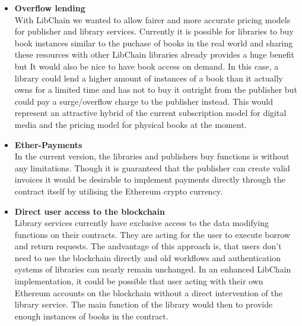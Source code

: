 \begin{itemize}
\item \textbf{Overflow lending}\\
With LibChain we wanted to allow fairer and more accurate pricing models for publisher and library services. Currently it is possible for libraries to buy book instances similar to the puchase of books in the real world and sharing these resources with other LibChain libraries already provides a huge benefit but It would also be nice to have book access on demand. In this case, a library could lend a higher amount of instances of a book than it actually owns for a limited time and has not to buy it outright from the publisher but could pay a surge/overflow charge to the publisher instead. This would represent an attractive hybrid of the current subscription model for digital media and the pricing model for physical books at the moment.

\item \textbf{Ether-Payments}\\
In the current version, the libraries and publishers buy functions is without any limitations. Though it is guaranteed that the publisher can create valid invoices it would be desirable to implement payments directly through the contract itself by utilising the Ethereum crypto currency.

\item \textbf{Direct user access to the blockchain}\\
Library services currently have exclusive access to the data modifying functions on their contracts. They are acting for the user to execute borrow and return requests. The andvantage of this approach is, that users don't need to use the blockchain directly and old workflows and authentication systems of libraries can nearly remain unchanged.
In an enhanced LibChain implementation, it could be possible that user acting with their own Ethereum accounts on the blockchain without a direct intervention of the library service. The main function of the library would then to provide enough instances of books in the contract.

\end{itemize}

